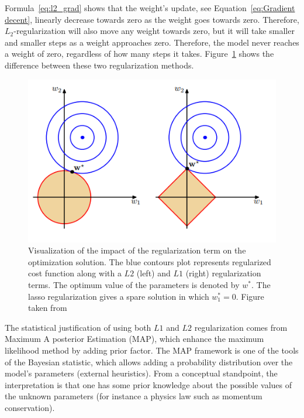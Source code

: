 Formula~\ref{eq:l2_grad} shows that the weight's update, see Equation~\ref{eq:Gradient decent}, linearly decrease towards zero as the weight goes towards zero. Therefore, $L_2$-regularization will also move any weight towards zero, but it will take smaller and smaller steps as a weight approaches zero. Therefore, the model never reaches a weight of zero, regardless of how many steps it takes. 
Figure~\ref{fig:L1vsL2} shows the difference between these two regularization methods. 


\begin{figure}[!h]
\centering
\includegraphics{figures/L1vsL2.PNG}
\caption{Visualization of the impact of the regularization term on the optimization solution. The blue contours plot represents regularized cost function along with a $L2$ (left) and $L1$ (right) regularization terms. The optimum value of the parameters is denoted by $w^{*}$. The lasso regularization gives a spare solution in which $w_{1}^*=0$. Figure taken from~\cite{bishop}  
\label{fig:L1vsL2}}
\end{figure}
The statistical justification of using both $L1$ and $L2$ regularization comes from Maximum A posterior Estimation (MAP), which enhance the maximum likelihood method by adding prior factor. The MAP framework is one of the tools of the Bayesian statistic, which allows adding a probability distribution over the model's parameters (external heuristics). From a conceptual standpoint, the interpretation is that one has some prior knowledge about the possible values of the unknown parameters (for instance a physics law such as momentum conservation).

